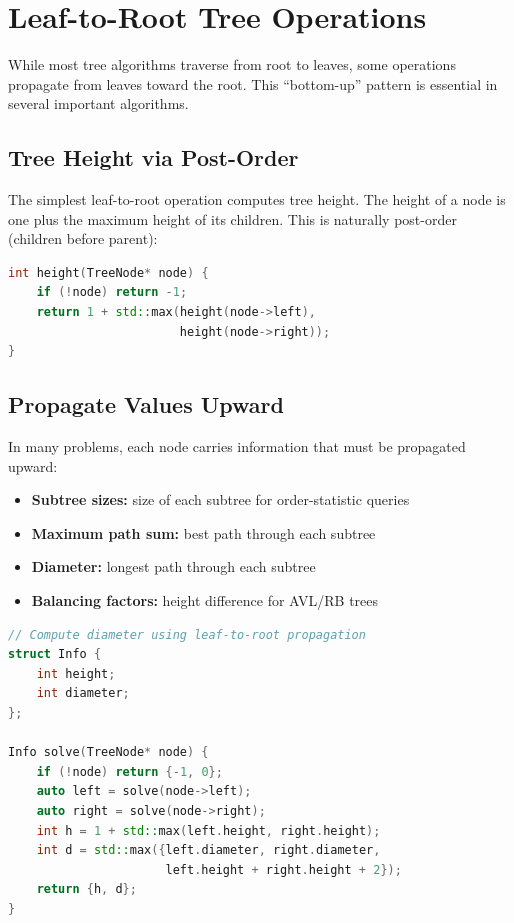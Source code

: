 \section{Leaf-to-Root Tree Operations}
\label{sec:leaf-to-root}

While most tree algorithms traverse from root to leaves, some operations propagate from leaves toward the root. This ``bottom-up'' pattern is essential in several important algorithms.

\subsection{Tree Height via Post-Order}

The simplest leaf-to-root operation computes tree height. The height of a node is one plus the maximum height of its children. This is naturally post-order (children before parent):

\begin{lstlisting}[language=C++]
int height(TreeNode* node) {
    if (!node) return -1;
    return 1 + std::max(height(node->left),
                        height(node->right));
}
\end{lstlisting}

\subsection{Propagate Values Upward}

In many problems, each node carries information that must be propagated upward:
\begin{itemize}
    \item \textbf{Subtree sizes:} size of each subtree for order-statistic queries
    \item \textbf{Maximum path sum:} best path through each subtree
    \item \textbf{Diameter:} longest path through each subtree
    \item \textbf{Balancing factors:} height difference for AVL/RB trees
\end{itemize}

\begin{lstlisting}[language=C++]
// Compute diameter using leaf-to-root propagation
struct Info {
    int height;
    int diameter;
};

Info solve(TreeNode* node) {
    if (!node) return {-1, 0};
    auto left = solve(node->left);
    auto right = solve(node->right);
    int h = 1 + std::max(left.height, right.height);
    int d = std::max({left.diameter, right.diameter,
                      left.height + right.height + 2});
    return {h, d};
}
\end{lstlisting}

